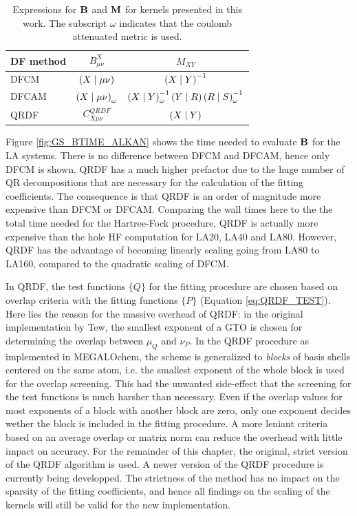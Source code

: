 \begin{table}
\begin{tabular}{lcc}
\hline
DF method & $B^X_{\mu\nu}$ & $M_{XY}$ \\
\hline
DFCM & $\left( X \mid \mu\nu \right)$ &  $\left( X \mid Y \right)^{-1}$ \\
DFCAM & $\left( X \mid \mu\nu \right)_{\omega}$ & $\left( X \mid Y \right)_{\omega}^{-1} \left( Y \mid R \right) \left( R \mid S \right)_{\omega}^{-1}$ \\
QRDF & $C^{QRDF}_{X\mu\nu}$ & $\left( X \mid Y \right)$ \\ 
\hline
\end{tabular}
\label{tab:BMTENSORS}
\caption{Expressions for $\mathbf{B}$ and $\mathbf{M}$ for kernels presented in this work. The subscript $\omega$ indicates that the coulomb attenuated metric is used.}
\end{table}

Figure \ref{fig:GS_BTIME_ALKAN} shows the time needed to evaluate $\mathbf{B}$ for the LA systems. There is no difference between DFCM and DFCAM, hence only DFCM is shown. QRDF has a much higher prefactor due to the huge number of QR decompositions that are necessary for the calculation of the fitting coefficients. The consequence is that QRDF is an order of magnitude more expensive than DFCM or DFCAM. Comparing the wall times here to the the total time needed for the Hartree-Fock procedure, QRDF is actually more expensive than the hole HF computation for LA20, LA40 and LA80. However, QRDF has the advantage of becoming linearly scaling going from LA80 to LA160, compared to the quadratic scaling of DFCM.  

In QRDF, the test functions $\{Q\}$ for the fitting procedure are chosen based on overlap criteria with the fitting functions $\{P\}$ (Equation \ref{eq:QRDF_TEST}). Here lies the reason for the massive overhead of QRDF: in the original implementation by Tew, the smallest exponent of a GTO is chosen for determining the overlap between $\mu_Q$ and $\nu_P$. In the QRDF procedure as implemented in MEGALOchem, the scheme is generalized to \emph{blocks} of basis shells centered on the same atom, i.e. the smallest exponent of the whole block is used for the overlap screening. This had the unwanted side-effect that the screening for the test functions is much harsher than necessary. Even if the overlap values for most exponents of a block with another block are zero, only one exponent decides wether the block is included in the fitting procedure. A more leniant criteria based on an average overlap or matrix norm can reduce the overhead with little impact on accuracy. For the remainder of this chapter, the original, strict version of the QRDF algorithm is used. A newer version of the QRDF procedure is currently being developped. The strictness of the method has no impact on the sparsity of the fitting coefficients, and hence all findings on the scaling of the kernels will still be valid for the new implementation.

